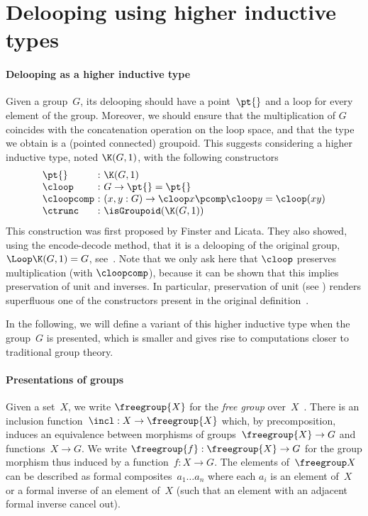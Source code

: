 \section{Delooping using higher inductive types}
\label{delooping-hit}

\paragraph{Delooping as a higher inductive type}
Given a group~$G$, its delooping should have a point~$\pt{}$ and a loop for
every element of the group. Moreover, we should ensure that the multiplication
of $G$ coincides with the concatenation operation on the loop space, and that
the type we obtain is a (pointed connected) groupoid. This suggests considering
a higher inductive type, noted $\K(G,1)$, with the following constructors
\[
  \begin{array}{l@{\ :\ }l}
    \pt{}&{\K(G,1)}\\
    \cloop&G\to\pt{}=\pt{}\\
    \cloopcomp&(x,y:G)\to\cloop x\pcomp\cloop y=\cloop(xy)\\
    \ctrunc&\isGroupoid(\K(G,1))
  \end{array}
\]
This construction was first proposed by Finster and Licata. They also showed,
using the encode-decode method, that it is a delooping of the original group,
\ie $\Loop\K(G,1)=G$, see~\cite[Theorem~3.2]{licata2014eilenberg}. Note that we
only ask here that $\cloop$ preserves multiplication (with $\cloopcomp$),
because it can be shown that this implies preservation of unit and inverses. In
particular, preservation of unit (see ) renders superfluous
one of the constructors present in the original
definition~\cite{licata2014eilenberg}.

In the following, we will define a variant of this higher inductive type when
the group~$G$ is presented, which is smaller and gives rise to computations
closer to traditional group theory.

\paragraph{Presentations of groups}
Given a set~$X$, we write $\freegroup{X}$ for the \emph{free group}
over~$X$~\cite[Theorem~6.11.6]{hottbook}. There is an inclusion
function~$\incl:X\to\freegroup{X}$ which, by precomposition, induces an
equivalence between morphisms of groups~$\freegroup{X}\to G$ and
functions~$X\to G$. We write $\freegroup{f}:\freegroup{X}\to G$ for the group
morphism thus induced by a function~$f:X\to G$.
The elements of~$\freegroup X$ can be described as formal
composites~$a_1\ldots a_n$ where each $a_i$ is an element of~$X$ or a formal
inverse of an element of~$X$ (such that an element with an adjacent formal
inverse cancel out).

